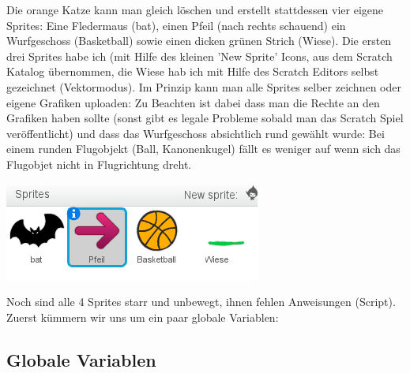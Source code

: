 Die orange Katze kann man gleich löschen und erstellt stattdessen vier eigene Sprites: Eine Fledermaus (bat), einen Pfeil (nach rechts schauend) ein Wurfgeschoss (Basketball) sowie einen dicken grünen Strich (Wiese). Die ersten drei Sprites habe ich (mit Hilfe des kleinen 'New Sprite' Icons, aus dem Scratch Katalog übernommen, die Wiese hab ich mit Hilfe des Scratch Editors selbst gezeichnet (Vektormodus). Im Prinzip kann man alle Sprites selber zeichnen oder eigene Grafiken uploaden: Zu Beachten ist dabei dass man die Rechte an den Grafiken haben sollte (sonst gibt es legale Probleme sobald man das Scratch Spiel veröffentlicht) und dass das Wurfgeschoss absichtlich rund gewählt wurde: Bei einem runden Flugobjekt (Ball, Kanonenkugel) fällt es weniger auf wenn sich das Flugobjet nicht in Flugrichtung dreht.

\begin{center}
\includegraphics[width=\linewidth]{scratch/fsprites.png}
\end{center}

Noch sind alle 4 Sprites starr und unbewegt, ihnen fehlen Anweisungen (Script). Zuerst kümmern wir uns um ein paar globale Variablen:

\subsection*{Globale Variablen}

